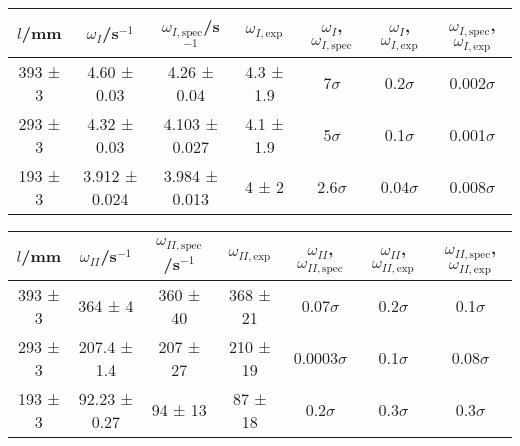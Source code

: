 \documentclass[12pt,a4paper,german]{scrartcl}
\begin{document}
  \begin{center}
    \begin{tabular}{c|c|c|c|c|c|c}
      $l$/mm & $\omega_I$/s$^{-1}$ & $\omega_{I,\text{spec}}$/s$^{-1}$ & $\omega_{I,\text{exp}}$ & $\omega_I$, $\omega_{I,\text{spec}}$ & $\omega_I$, $\omega_{I,\text{exp}}$ & $\omega_{I,\text{spec}}$, $\omega_{I,\text{exp}}$ \\
      \hline
      393 ± 3 &  4.60 ± 0.03  &  4.26 ± 0.04  & 4.3 ± 1.9 &     7$\sigma$ &    0.2$\sigma$ &  0.002$\sigma$ \\
      293 ± 3 &  4.32 ± 0.03  & 4.103 ± 0.027 & 4.1 ± 1.9 &     5$\sigma$ &    0.1$\sigma$ &  0.001$\sigma$ \\
      193 ± 3 & 3.912 ± 0.024 & 3.984 ± 0.013 &   4 ± 2   &   2.6$\sigma$ &   0.04$\sigma$ &  0.008$\sigma$
    \end{tabular}
    \label{table_beats_omega_I}
  \end{center}

  \begin{center}
    \begin{tabular}{c|c|c|c|c|c|c}
      $l$/mm & $\omega_{II}$/s$^{-1}$ & $\omega_{II,\text{spec}}$/s$^{-1}$ & $\omega_{II,\text{exp}}$ & $\omega_{II}$, $\omega_{II,\text{spec}}$ & $\omega_{II}$, $\omega_{II,\text{exp}}$ & $\omega_{II,\text{spec}}$, $\omega_{II,\text{exp}}$ \\
      \hline
      393 ± 3 &   364 ± 4    & 360 ± 40 & 368 ± 21 &   0.07$\sigma$ & 0.2$\sigma$ &  0.1$\sigma$ \\
      293 ± 3 & 207.4 ± 1.4  & 207 ± 27 & 210 ± 19 & 0.0003$\sigma$ & 0.1$\sigma$ & 0.08$\sigma$ \\
      193 ± 3 & 92.23 ± 0.27 &  94 ± 13 &  87 ± 18 &    0.2$\sigma$ & 0.3$\sigma$ &  0.3$\sigma$
    \end{tabular}
    \label{table_beats_omega_II}
  \end{center}
\end{document}
